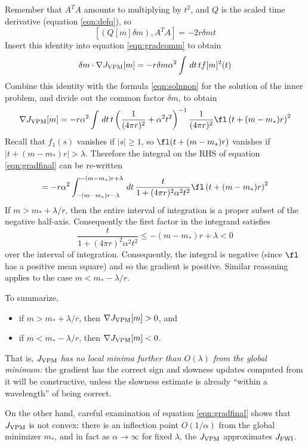 Remember that $A^TA$ amounts to multiplying by $t^2$, and $Q$ is the scaled time derivative (equation \ref{eqn:defq}), so
\begin{equation}
\label{eqn:comm3}
[(Q[m]\delta m),A^TA]=-2r\delta mt
\end{equation}
Insert this identity into equation \ref{eqn:gradcomm} to obtain
\begin{equation}
\label{eqn:comm4}
\delta m \cdot \nabla J_{\rm VPM}[m] =  -r\delta m \alpha^2\int \,dt\,tf[m]^2(t)
\end{equation}
Combine this identity with the formula \ref{eqn:solnnon} for the
solution of the inner problem, and divide out the common factor
$\delta m $, to obtain
\begin{equation}
\label{eqn:gradfinal}
\nabla J_{\rm VPM}[m] = -r\alpha^2\int \,dt\,t\left(\frac{1}{(4\pi r)^2} + \alpha^2 t^2\right)^{-1}\frac{1}{(4\pi r)^2}\fl\left(t+(m-m_*)r\right)^2
\end{equation}
Recall that $f_1(s)$ vanishes if $|s|\ge 1$, so $\fl(t+(m-m_*)r)$
vanishes if $|t+(m-m_*)r| > \lambda$. Therefore the integral on the
RHS of equation \ref{eqn:gradfinal} can be re-written
\[
  = -r\alpha^2\int_{-(m-m_*)r-\lambda}^{-(m-m_*)r+\lambda}
  \,dt\, \frac{t}{1+(4\pi r)^2\alpha^2 t^2}\fl\left(t+(m-m_*)r\right)^2
\]
If $m > m_*+\lambda/r$, then the entire interval of integration is a proper
subset of the negative half-axis. Consequently the first factor in the
integrand satisfies
\[
 \frac{t}{1+(4\pi r)^2\alpha^2 t^2}
  \le -(m-m_*)r+\lambda < 0
\]
over the interval of integration. Consequently, the integral is
negative (since $\fl$ has a positive mean square) and so the gradient
is positive. Similar reasoning applies to the case $m <
m_*-\lambda/r$.

To summarize,
\begin{itemize}
\item if $m > m_*+\lambda/r$, then $\nabla J_{\rm VPM}[m] > 0$, and
\item if $m < m_*-\lambda/r$, then $\nabla J_{\rm VPM}[m] < 0$.
\end{itemize}
That is, {\em $J_{\rm VPM}$ has no local minima
  further than  $O(\lambda)$ from the global minimum:} the gradient
has the correct sign and slowness updates computed from it will be
constructive, unless the slowness estimate is already ``within a
wavelength'' of being correct.

On the other hand, careful examination of equation \ref{eqn:gradfinal}
shows that $J_{\rm VPM}$ is not convex: there is an inflection point
$O(1/\alpha)$ from the global minimizer $m_*$, and in fact as $\alpha
\rightarrow \infty$ for fixed $\lambda$, the $J_{\rm VPM}$
approximates $J_{\rm FWI}$. 

